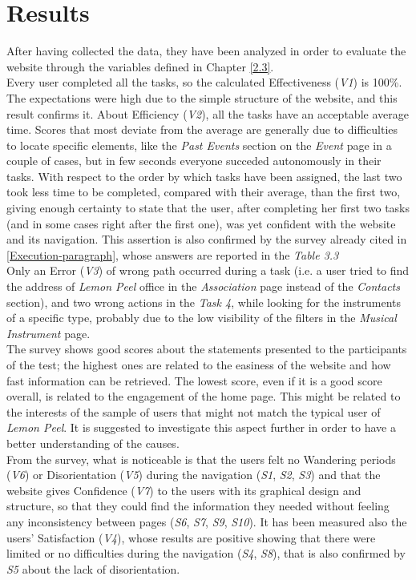 \documentclass[../../UsabilityReport.tex]{subfiles}
\begin{document}
\section{Results}
	After having collected the data, they have been analyzed in order to evaluate the website through the variables defined in Chapter \ref{2.3}. \\
	Every user completed all the tasks, so the calculated Effectiveness (\textit{V1}) is 100\%. The expectations were high due to the simple structure of the website, and this result confirms it. About Efficiency (\textit{V2}), all the tasks have an acceptable average time. Scores that most deviate from the average are generally due to difficulties to locate specific elements, like the \textit{Past Events} section on the \textit{Event} page in a couple of cases, but in few seconds everyone succeded autonomously in their tasks. With respect to the order by which tasks have been assigned, the last two took less time to be completed, compared with their average, than the first two, giving enough certainty to state that the user, after completing her first two tasks (and in some cases right after the first one), was yet confident with the website and its navigation. This assertion is also confirmed by the survey already cited in \ref{Execution-paragraph}, whose answers are reported in the \textit{Table 3.3}\\
	Only an Error (\textit{V3}) of wrong path occurred during a task (i.e. a user tried to find the address of \textit{Lemon Peel} office in the \textit{Association} page instead of the \textit{Contacts} section), and two wrong actions in the \textit{Task 4}, while looking for the instruments of a specific type, probably due to the low visibility of the filters in the \textit{Musical Instrument} page. \\

	The survey shows good scores about the statements presented to the participants of the test; the highest ones are related to the easiness of the website and how fast information can be retrieved. The lowest score, even if it is a good score overall, is related to the engagement of the home page. This might be related to the interests of the sample of users that might not match the typical user of \textit{Lemon Peel}. It is suggested to investigate this aspect further in order to have a better understanding of the causes. \\
	From the survey, what is noticeable is that the users felt no Wandering periods (\textit{V6}) or Disorientation (\textit{V5}) during the navigation (\textit{S1}, \textit{S2}, \textit{S3}) and that the website gives Confidence (\textit{V7}) to the users with its graphical design and structure, so that they could find the information they needed without feeling any inconsistency between pages (\textit{S6}, \textit{S7}, \textit{S9}, \textit{S10}). It has been measured also the users' Satisfaction (\textit{V4}), whose results are positive showing that there were limited or no difficulties during the navigation (\textit{S4}, \textit{S8}), that is also confirmed by \textit{S5} about the lack of disorientation.
	
\end{document}
